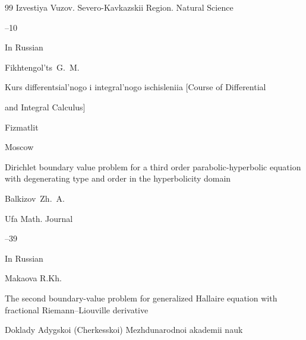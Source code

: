 \begin{thebibliography}{99}
\jour Izvestiya Vuzov. Severo-Kavkazskii Region. Natural Science



--10











\lang In Russian

\by Fikhtengol'ts~G.~M.

\book Kurs differentsial'nogo i integral'nogo ischisleniia \rm [Course of Differential

and Integral Calculus]



\publ Fizmatlit

\publaddr Moscow









\paper Dirichlet boundary value problem for a third order parabolic-hyperbolic equation with degenerating type and order in the hyperbolicity domain

\by Balkizov~Zh.~A.

\jour Ufa Math. Journal




--39










\lang In Russian

\by Makaova R.Kh.

\paper The second boundary-value problem for generalized Hallaire equation with fractional Riemann--Liouville derivative

\jour Doklady Adygskoi (Cherkesskoi) Mezhdunarodnoi akademii nauk


\end{thebibliography}
